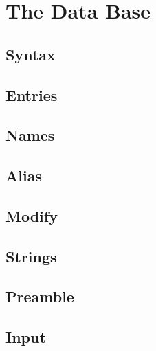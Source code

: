 
\chapter{The Data Base}

\section{Syntax}


\section{Entries}


\section{Names}


\section{Alias}


\section{Modify}


\section{Strings}


\section{Preamble}


\section{Input}


\endinput
%

